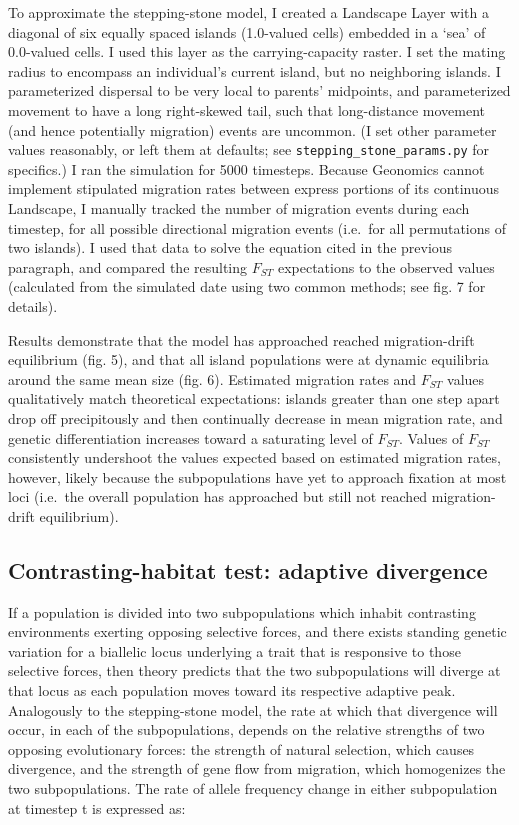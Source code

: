 ﻿\documentclass{article}
\begin{document}
To approximate the stepping-stone model, I created a Landscape Layer with
a diagonal of six equally spaced islands (1.0-valued cells) embedded in 
a `sea' of 0.0-valued cells. I used this layer as the carrying-capacity raster. I set the
mating radius to encompass an individual's current island, but no neighboring islands. I
parameterized dispersal to be very local to parents' midpoints, and
parameterized movement to have a long right-skewed tail, such that long-distance movement
(and hence potentially migration) events are uncommon.
(I set other parameter values reasonably, or left them at defaults; see 
\texttt{stepping\_stone\_params.py} for specifics.) I ran the simulation for 5000 timesteps.
Because Geonomics cannot implement stipulated migration rates between
express portions of its continuous Landscape, I manually tracked the number of
migration events during each timestep, for all possible directional migration events 
(i.e.\ for all permutations of two islands). I used that data to solve the equation cited in the previous paragraph, and compared the resulting $F_{ST}$ expectations to the observed
values (calculated from the simulated date using two common methods;
see fig. 7 for details).

Results demonstrate that the model has approached reached migration-drift equilibrium
(fig. 5), and that all island populations were at dynamic equilibria around the
same mean size (fig. 6). Estimated migration rates and $F_{ST}$ values qualitatively
match theoretical expectations: islands greater than one step apart drop off 
precipitously and then continually decrease in mean migration rate,
and genetic differentiation increases toward a saturating level of $F_{ST}$.
Values of $F_{ST}$ consistently undershoot the values expected based on estimated
migration rates, however, likely because the subpopulations have yet to approach fixation
at most loci (i.e.\ the overall population has approached but still not reached
migration-drift equilibrium).

\subsection{Contrasting-habitat test: adaptive divergence}
If a population is divided into two subpopulations which inhabit contrasting
environments exerting opposing selective forces, and there exists standing genetic
variation for a biallelic locus underlying a trait that is responsive to those
selective forces, then theory predicts that the two subpopulations will diverge at
that locus as each population moves toward its respective adaptive peak. Analogously
to the stepping-stone model, the rate at which that divergence will occur,
in each of the subpopulations, depends on the relative strengths
of two opposing evolutionary forces: the strength of natural selection,
which causes divergence, and the strength of gene flow from migration,
which homogenizes the two subpopulations. The rate of allele frequency change
in either subpopulation at timestep t is expressed as:
\end{document}
